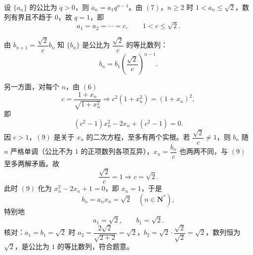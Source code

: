 \begin{answer}
设 $\{a_n\}$ 的公比为 $q>0$，则 $a_n=a_1q^{n-1}$。由 $(7)$，$n\geqslant2$ 时 $1<a_n\leqslant\sqrt2$，数列有界且不趋于 $0$，故 $q=1$，即
\nopagebreak[4]
\[a_1=a_2=\cdots=c,\qquad1<c\leqslant\sqrt2.\]

由 $b_{n+1}=\dfrac{\sqrt2}{c}b_n$ 知 $\{b_n\}$ 是公比为 $\dfrac{\sqrt2}{c}$ 的等比数列：
\nopagebreak[4]
\[b_n=b_1\left(\frac{\sqrt2}{c}\right)^{n-1}.\]

另一方面，对每个 $n$，由 $(6)$
\nopagebreak[4]
\[c=\frac{1+x_n}{\sqrt{1+x_n^2}}\Longrightarrow c^2\left(1+x_n^2\right)=\left(1+x_n\right)^2,\]
即
\nopagebreak[4]
\[\left(c^2-1\right)x_n^2-2x_n+\left(c^2-1\right)=0. \tag{9}\]
因 $c>1$，$(9)$ 是关于 $x_n$ 的二次方程，至多有两个实根。若 $\dfrac{\sqrt2}{c}\neq1$，则 $b_n$ 随 $n$ 严格单调（公比不为 $1$ 的正项数列各项互异），$x_n=\dfrac{b_n}{c}$ 也两两不同，与 $(9)$ 至多两解矛盾。故
\nopagebreak[4]
\[\frac{\sqrt2}{c}=1\Longrightarrow c=\sqrt2.\]
此时 $(9)$ 化为 $x_n^2-2x_n+1=0$，即 $x_n=1$，于是
\nopagebreak[4]
\[b_n=a_nx_n=\sqrt2\quad(n\in\mathbf N^*),\]
特别地
\nopagebreak[4]
\[a_1=\sqrt2,\qquad b_1=\sqrt2.\]
核对：$a_1=b_1=\sqrt2$ 时 $a_2=\dfrac{2\sqrt2}{\sqrt{2+2}}=\sqrt2$，$b_2=\sqrt2\cdot\dfrac{\sqrt2}{\sqrt2}=\sqrt2$，数列恒为 $\sqrt2$，是公比为 $1$ 的等比数列，符合题意。



\end{answer}
